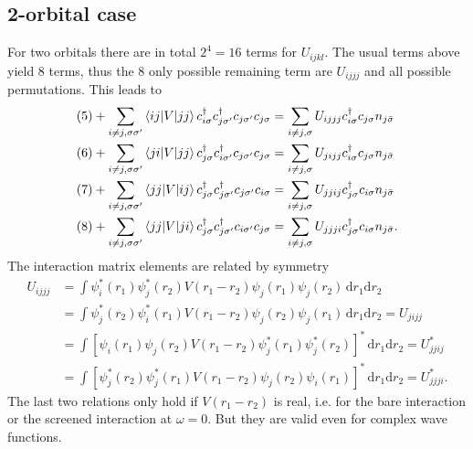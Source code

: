 \documentclass[12pt,a4paper]{scrartcl}
\numberwithin{equation}{section}
\begin{document}
\subsection{2-orbital case}
For two orbitals there are in total $2^4=16$ terms for $U_{ijkl}$. The usual terms above yield $8$ terms, 
thus the $8$ only possible remaining term are $U_{ijjj}$ and all possible permutations.
This leads to
\begin{align}
 &(5) +\sum_{i\neq j,\sigma\sigma'} \braket{ij|V|jj} c^{\dagger}_{i\sigma} c^{\dagger}_{j\sigma'} c_{j\sigma'} c_{j\sigma} 
   =\sum_{i\neq j,\sigma} U_{ijjj} c^{\dagger}_{i\sigma}  c_{j\sigma} n_{j\bar{\sigma}} \\
%
 &(6) + \sum_{i\neq j,\sigma\sigma'} \braket{ji|V|jj} c^{\dagger}_{j\sigma} c^{\dagger}_{i\sigma'} c_{j\sigma'} c_{j\sigma} 
   =\sum_{i\neq j,\sigma} U_{jijj} c^{\dagger}_{i\sigma}  c_{j\sigma} n_{j\bar{\sigma}} \\
%
 &(7) + \sum_{i\neq j,\sigma\sigma'} \braket{jj|V|ij} c^{\dagger}_{j\sigma} c^{\dagger}_{j\sigma'} c_{j\sigma'} c_{i\sigma} 
   =\sum_{i\neq j,\sigma} U_{jjij} c^{\dagger}_{j\sigma} c_{i\sigma}  n_{j\bar{\sigma}} \\
%
 &(8) + \sum_{i\neq j,\sigma\sigma'} \braket{jj|V|ji} c^{\dagger}_{j\sigma} c^{\dagger}_{j\sigma'} c_{i\sigma'} c_{j\sigma} 
   =\sum_{i\neq j,\sigma} U_{jjji} c^{\dagger}_{j\sigma} c_{i\sigma}  n_{j\bar{\sigma}} .
\end{align}
The interaction matrix elements are related by symmetry
\begin{align}
 U_{ijjj}
 &= \int \psi^*_i(r_1) \psi^*_j(r_2) V(r_1-r_2) \psi_j(r_1) \psi_j(r_2) \, \mathrm{d}r_1\mathrm{d}r_2 \\
 &= \int \psi^*_j(r_2) \psi^*_i(r_1) V(r_1-r_2) \psi_j(r_2) \psi_j(r_1) \, \mathrm{d}r_1\mathrm{d}r_2 = U_{jijj}\\
 &= \int \left[ \psi_i(r_1) \psi_j(r_2) V(r_1-r_2) \psi^*_j(r_1) \psi^*_j(r_2) \right]^* \, \mathrm{d}r_1\mathrm{d}r_2 = U^*_{jjij}\\
 &= \int \left[ \psi^*_j(r_2) \psi^*_j(r_1) V(r_1-r_2)  \psi_j(r_2) \psi_i(r_1)\right]^* \, \mathrm{d}r_1\mathrm{d}r_2 = U^*_{jjji} .
\end{align}
The last two relations only hold if $V(r_1-r_2)$ is real, i.e. for the bare interaction or the screened interaction at $\omega=0$. But they are valid even for complex wave functions.
\end{document}
